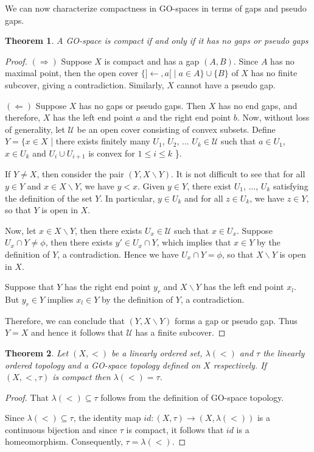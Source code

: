 \documentclass[12pt,oneside,english]{amsbook}
\numberwithin{equation}{section} %
\numberwithin{figure}{section} %
\theoremstyle{plain}
\numberwithin{section}{chapter}
\newtheorem{thm}{Theorem}[section]
\theoremstyle{plain}
\begin{document}
We can now characterize compactness in GO-spaces in terms of gaps and pseudo gaps.
\begin{thm}\label{go:compactness:1}
  A GO-space is compact if and only if it has no gaps or pseudo gaps
\end{thm}
\begin{proof}
  $(\Rightarrow)$  Suppose $X$ is compact and has a gap $(A,B)$. Since $A$ has no maximal point, then the open cover $\{]\leftarrow,a[ \; | \; a \in A \} \cup \{B\}$ of $X$ has no finite subcover, giving a contradiction. Similarly, $X$ cannot have a pseudo gap.

  $(\Leftarrow)$ Suppose $X$ has no gaps or pseudo gaps. Then $X$ has no end gaps, and therefore, $X$  has the left end point $a$ and the right end point $b$. Now, without loss of generality, let $\mathcal{U}$ be an open cover consisting of convex subsets. Define $Y = \{x \in X$ | there exists finitely many $U_{1}$, $U_{2}$, $\ldots$ $U_{k} \in \mathcal{U}$ such that $a \in U_{1}$, $x \in U_{k}$ and $U_{i} \cup U_{i+1}$ is convex for $1 \leq i \leq k$ \}.

  If $Y \neq X$, then consider the pair $(Y, X \backslash Y)$.
  It is not difficult to see that for all $y \in Y$ and $x \in X \backslash Y$, we have $y < x$. Given  $y \in Y$, there exist $U_1$, $\ldots$, $U_k$ satisfying the definition of the set $Y$. In particular, $y \in U_k$ and for all $z \in U_k$, we have $z \in Y$, so that $Y$ is open in $X$.

Now, let $x \in X \backslash Y$, then there exists $U_{x} \in \mathcal{U}$ such that $x \in U_{x}$. Suppose $U_{x} \cap Y \neq \phi$, then there exists $y' \in U_{x} \cap Y$, which implies that $x \in Y$ by the definition of $Y$, a contradiction. Hence we have $U_{x} \cap Y = \phi$, so that $X \backslash Y$ is open in $X$.

Suppose that $Y$ has the right end point $y_r$ and $X \backslash Y$ has the left end point $x_{l}$. But $y_r \in Y$ implies $x_l \in Y$ by the definition of $Y$, a contradiction. 

Therefore, we can conclude that $(Y, X \backslash Y)$ forms a gap or pseudo gap. Thus $Y = X$ and hence it follows that $\mathcal{U}$ has a finite subcover.
\end{proof}

\begin{thm}
  Let $(X,<)$ be a linearly ordered set, $\lambda(<)$ and $\tau$ the linearly ordered topology and a GO-space topology defined on $X$ respectively. If $(X,<,\tau)$ is compact then $\lambda(<) = \tau$.
\end{thm}
\begin{proof}
  That $\lambda(<) \subseteq \tau$ follows from the definition of GO-space topology.

  Since $\lambda(<) \subseteq \tau$, the identity map $id: (X,\tau) \to (X,\lambda(<))$ is a continuous bijection and since $\tau$ is compact, it follows that $id$ is a homeomorphism. Consequently, $\tau = \lambda(<)$.
\end{proof}
\end{document}
